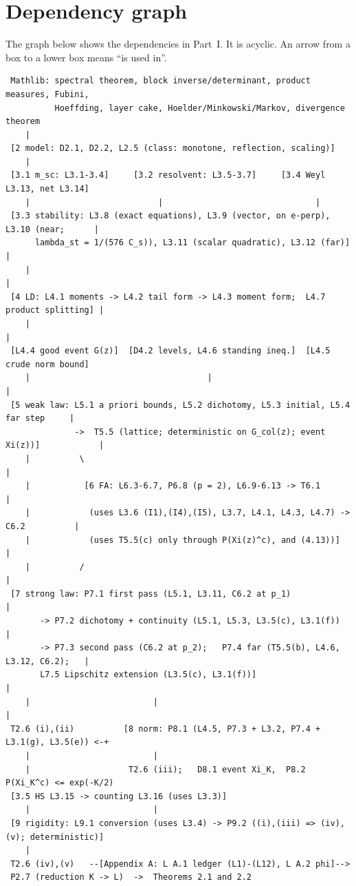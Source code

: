 \section{Dependency graph}\label{app:dep}
The graph below shows the dependencies in Part~I. It is acyclic. An arrow from a box to a lower box means ``is used in''.
{\small
\begin{verbatim}
 Mathlib: spectral theorem, block inverse/determinant, product measures, Fubini,
          Hoeffding, layer cake, Hoelder/Minkowski/Markov, divergence theorem
    |
 [2 model: D2.1, D2.2, L2.5 (class: monotone, reflection, scaling)]
    |
 [3.1 m_sc: L3.1-3.4]     [3.2 resolvent: L3.5-3.7]     [3.4 Weyl L3.13, net L3.14]
    |                          |                               |
 [3.3 stability: L3.8 (exact equations), L3.9 (vector, on e-perp), L3.10 (near;      |
      lambda_st = 1/(576 C_s)), L3.11 (scalar quadratic), L3.12 (far)]                |
    |                                                                                |
 [4 LD: L4.1 moments -> L4.2 tail form -> L4.3 moment form;  L4.7 product splitting] |
    |                                                                                |
 [L4.4 good event G(z)]  [D4.2 levels, L4.6 standing ineq.]  [L4.5 crude norm bound]
    |                                    |                                           |
 [5 weak law: L5.1 a priori bounds, L5.2 dichotomy, L5.3 initial, L5.4 far step     |
              ->  T5.5 (lattice; deterministic on G_col(z); event Xi(z))]            |
    |          \                                                                     |
    |           [6 FA: L6.3-6.7, P6.8 (p = 2), L6.9-6.13 -> T6.1                     |
    |            (uses L3.6 (I1),(I4),(I5), L3.7, L4.1, L4.3, L4.7) -> C6.2          |
    |            (uses T5.5(c) only through P(Xi(z)^c), and (4.13))]                 |
    |          /                                                                     |
 [7 strong law: P7.1 first pass (L5.1, L3.11, C6.2 at p_1)                           |
       -> P7.2 dichotomy + continuity (L5.1, L5.3, L3.5(c), L3.1(f))                 |
       -> P7.3 second pass (C6.2 at p_2);   P7.4 far (T5.5(b), L4.6, L3.12, C6.2);   |
       L7.5 Lipschitz extension (L3.5(c), L3.1(f))]                                  |
    |                         |                                                      |
 T2.6 (i),(ii)          [8 norm: P8.1 (L4.5, P7.3 + L3.2, P7.4 + L3.1(g), L3.5(e)) <-+
    |                         |
    |                    T2.6 (iii);   D8.1 event Xi_K,  P8.2  P(Xi_K^c) <= exp(-K/2)
 [3.5 HS L3.15 -> counting L3.16 (uses L3.3)]
    |                         |
 [9 rigidity: L9.1 conversion (uses L3.4) -> P9.2 ((i),(iii) => (iv),(v); deterministic)]
    |
 T2.6 (iv),(v)   --[Appendix A: L A.1 ledger (L1)-(L12), L A.2 phi]-->
 P2.7 (reduction K -> L)  ->  Theorems 2.1 and 2.2
\end{verbatim}
}

